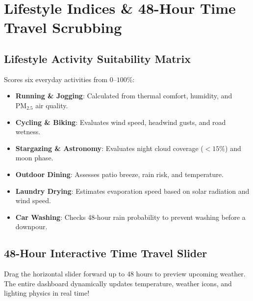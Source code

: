 \documentclass[11pt,a4paper]{article}
\begin{document}
\section{Lifestyle Indices \& 48-Hour Time Travel Scrubbing}

\subsection{Lifestyle Activity Suitability Matrix}
Scores six everyday activities from $0\text{--}100\%$:
\begin{itemize}[leftmargin=1.5em, itemsep=2pt]
  \item \textbf{Running \& Jogging}: Calculated from thermal comfort, humidity, and $\text{PM}_{2.5}$ air quality.
  \item \textbf{Cycling \& Biking}: Evaluates wind speed, headwind gusts, and road wetness.
  \item \textbf{Stargazing \& Astronomy}: Evaluates night cloud coverage ($<15\%$) and moon phase.
  \item \textbf{Outdoor Dining}: Assesses patio breeze, rain risk, and temperature.
  \item \textbf{Laundry Drying}: Estimates evaporation speed based on solar radiation and wind speed.
  \item \textbf{Car Washing}: Checks 48-hour rain probability to prevent washing before a downpour.
\end{itemize}

\subsection{48-Hour Interactive Time Travel Slider}
Drag the horizontal slider forward up to 48 hours to preview upcoming weather. The entire dashboard dynamically updates temperature, weather icons, and lighting physics in real time!
\end{document}
